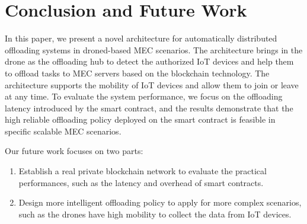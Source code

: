 \section{Conclusion and Future Work}
In this paper, we present a novel architecture for automatically distributed offloading systems in droned-based MEC scenarios.
The architecture brings in the drone as the offloading hub to detect the authorized IoT devices and help them to offload tasks to MEC servers based on the blockchain technology.
The architecture supports the mobility of IoT devices and allow them to join or leave at any time.
To evaluate the system performance, we focus on the offloading latency introduced by the smart contract, and the results demonstrate that the high reliable offloading policy deployed on the smart contract is feasible in specific scalable MEC scenarios.

Our future work focuses on two parts:
\begin{enumerate}
\item Establish a real private blockchain network to evaluate the practical performances, such as the latency and overhead of smart contracts.
\item Design more intelligent offloading policy to apply for more complex scenarios, such as the drones have high mobility to collect the data from IoT devices.
\end{enumerate}

